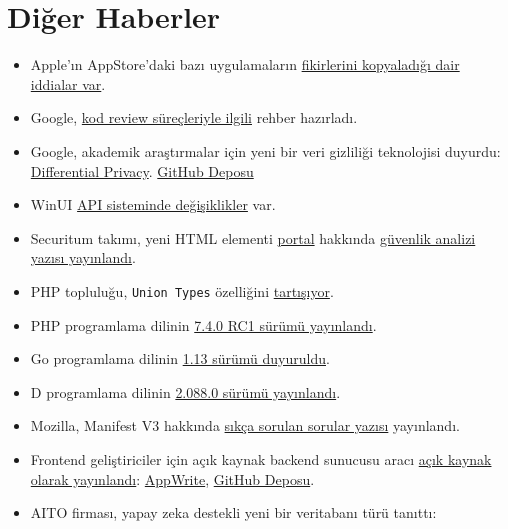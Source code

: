 \documentclass[11pt]{article}
\begin{document}
\section{Diğer Haberler}
\label{sec:org6174593}
\begin{itemize}
\item Apple'ın AppStore'daki bazı uygulamaların \href{https://www.washingtonpost.com/technology/2019/09/05/how-apple-uses-its-app-store-copy-best-ideas/?noredirect=on}{fikirlerini kopyaladığı dair
iddialar var}.
\item Google, \href{https://google.github.io/eng-practices/review/}{kod review süreçleriyle ilgili} rehber hazırladı.
\item Google, akademik araştırmalar için yeni bir veri gizliliği teknolojisi
duyurdu: \href{https://developers.googleblog.com/2019/09/enabling-developers-and-organizations.html}{Differential Privacy}. \href{https://developers.googleblog.com/2019/09/enabling-developers-and-organizations.html}{GitHub Deposu}
\item WinUI \href{https://twitter.com/dotMorten/status/1168218666619375616}{API sisteminde değişiklikler} var.
\item Securitum takımı, yeni HTML elementi \href{https://web.dev/hands-on-portals}{portal} hakkında \href{https://research.securitum.com/security-analysis-of-portal-element/}{güvenlik analizi yazısı
yayınlandı}.
\item PHP topluluğu, \texttt{Union Types} özelliğini \href{https://github.com/php/php-rfcs/pull/1}{tartışıyor}.
\item PHP programlama dilinin \href{https://www.php.net/archive/2019.php\#2019-09-05-1}{7.4.0 RC1 sürümü yayınlandı}.
\item Go programlama dilinin \href{https://golang.org/doc/go1.13}{1.13 sürümü duyuruldu}.
\item D programlama dilinin \href{https://dlang.org/blog/2019/09/06/dmd-2-088-0-released/}{2.088.0 sürümü yayınlandı}.
\item Mozilla, Manifest V3 hakkında \href{https://blog.mozilla.org/addons/2019/09/03/mozillas-manifest-v3-faq/}{sıkça sorulan sorular yazısı} yayınlandı.
\item Frontend geliştiriciler için açık kaynak backend sunucusu aracı \href{https://medium.com/eldadfux/introducing-appwrite-an-open-source-backend-server-for-mobile-web-developers-4be70731575d}{açık kaynak
olarak yayınlandı}: \href{https://appwrite.io/}{AppWrite}, \href{https://github.com/appwrite/appwrite}{GitHub Deposu}.
\item AITO firması, yapay zeka destekli yeni bir veritabanı türü tanıttı:

\end{itemize}
\end{document}
